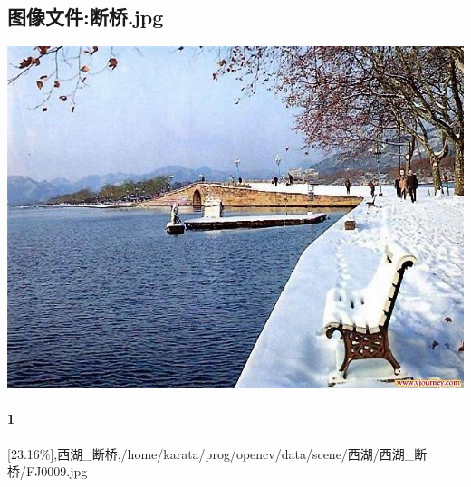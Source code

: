 \subsection{图像文件:断桥.jpg}
\includegraphics[width=15cm,angle=0]{断桥.jpg}

\paragraph{1}
[23.16\%],西湖_断桥,/home/karata/prog/opencv/data/scene/西湖/西湖_断桥/FJ0009.jpg

